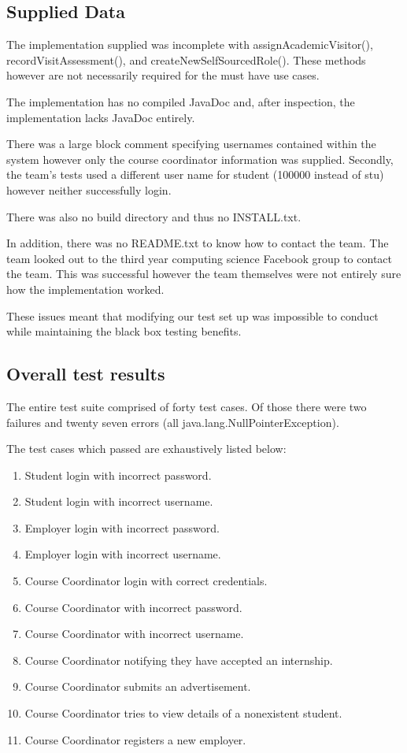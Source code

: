 \documentclass[11pt]{l3deliverable}
\begin{document}
\subsection{Supplied Data}

The implementation supplied was incomplete with assignAcademicVisitor(),
recordVisitAssessment(), and createNewSelfSourcedRole(). These methods however
are not necessarily required for the must have use cases.

The implementation has no compiled JavaDoc and, after inspection, the
implementation lacks JavaDoc entirely.

There was a large block comment specifying usernames contained within the
system however only the course coordinator information was supplied. Secondly,
the team's tests used a different user name for student (100000 instead of
stu) however neither successfully login.

There was also no build directory and thus no INSTALL.txt.

In addition, there was no README.txt to know how to contact the team. The
team looked out to the third year computing science Facebook group to contact
the team. This was successful however the team themselves were not entirely
sure how the implementation worked.

These issues meant that modifying our test set up was impossible to conduct
while maintaining the black box testing benefits.

\subsection{Overall test results}

The entire test suite comprised of forty test cases. Of those there were two
failures and twenty seven errors (all java.lang.NullPointerException).

The test cases which passed are exhaustively listed below:

\begin{enumerate}
	\item Student login with incorrect password.
	\item Student login with incorrect username.
	\item Employer login with incorrect password.
	\item Employer login with incorrect username.
	\item Course Coordinator login with correct credentials.
	\item Course Coordinator with incorrect password.
	\item Course Coordinator with incorrect username.
	\item Course Coordinator notifying they have accepted an internship.
	\item Course Coordinator submits an advertisement.
	\item Course Coordinator tries to view details of a nonexistent student.
	\item Course Coordinator registers a new employer.
\end{enumerate}
\end{document}
